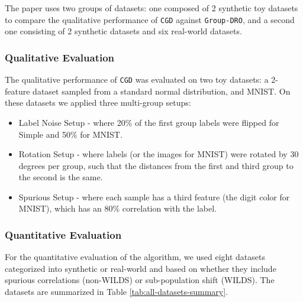The paper uses two groups of datasets: one composed of 2 synthetic toy datasets to compare the qualitative performance of \texttt{CGD} against \texttt{Group-DRO}, and a second one consisting of 2 synthetic datasets and six real-world datasets.


\subsubsection{Qualitative Evaluation} The qualitative performance of \texttt{CGD} was evaluated on two toy datasets: a 2-feature dataset sampled from a standard normal distribution, and {MNIST}. On these datasets we applied three multi-group setups:
\begin{itemize}
    \item Label Noise Setup - where 20\% of the first group labels were flipped for Simple and 50\% for MNIST.
    \item Rotation Setup - where labels (or the images for MNIST) were rotated by 30 degrees per group, such that the distances from the first and third group to the second is the same.
    \item Spurious Setup - where each sample has a third feature (the digit color for MNIST), which has an 80\% correlation with the label.
\end{itemize}


\subsubsection{Quantitative Evaluation}
For the quantitative evaluation of the algorithm, we used eight datasets categorized into synthetic or real-world and based on whether they include spurious correlations (non-WILDS) or sub-population shift (WILDS). The datasets are summarized in Table \ref{tab:all-datasets-summary}.


